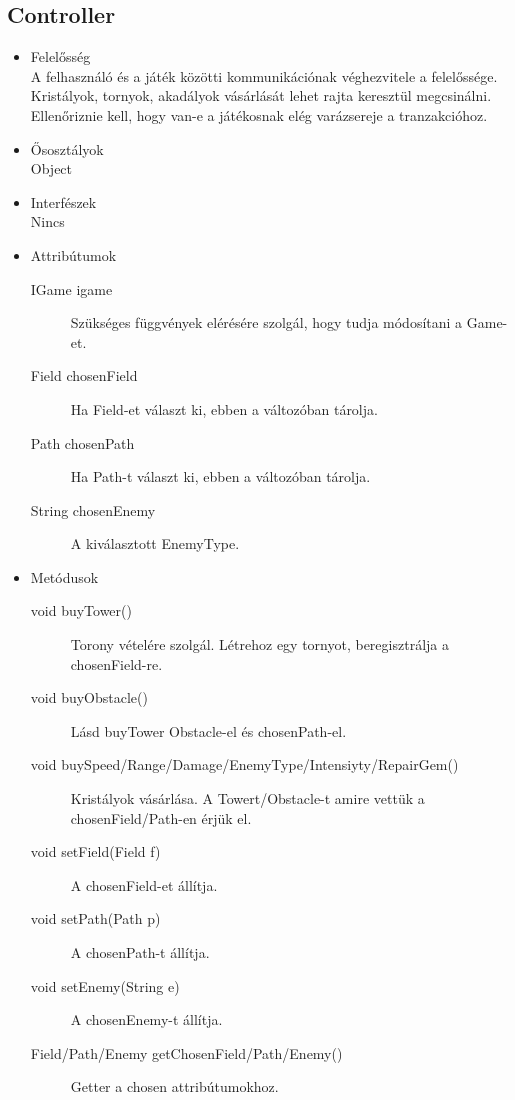 \subsection{Controller}
\begin{itemize}
\item Felelősség\\
A felhasználó és a játék közötti kommunikációnak véghezvitele a felelőssége. Kristályok, tornyok, akadályok vásárlását lehet rajta keresztül megcsinálni. Ellenőriznie kell, hogy van-e a játékosnak elég varázsereje a tranzakcióhoz.
\item Ősosztályok\\
Object
\item Interfészek\\
Nincs
\item Attribútumok\\
	\begin{description}
		\item[IGame igame] Szükséges függvények elérésére szolgál, hogy tudja módosítani a Game-et. 
		\item[Field chosenField] Ha Field-et választ ki, ebben a változóban tárolja. 
		\item[Path chosenPath] Ha Path-t választ ki, ebben a változóban tárolja. 
		\item[String chosenEnemy] A kiválasztott EnemyType. 

		
	\end{description}
\item Metódusok\\
	\begin{description}
		
		\item[void buyTower()] Torony vételére szolgál. Létrehoz egy tornyot, beregisztrálja a chosenField-re. 
		\item[void buyObstacle()] Lásd buyTower Obstacle-el és chosenPath-el. 
		\item[void buySpeed/Range/Damage/EnemyType/Intensiyty/RepairGem()] Kristályok vásárlása. A Towert/Obstacle-t amire vettük a chosenField/Path-en érjük el. 
		\item[void setField(Field f)] A chosenField-et állítja. 
		\item[void setPath(Path p)] A chosenPath-t állítja. 
		\item[void setEnemy(String e)] A chosenEnemy-t állítja. 
		\item[Field/Path/Enemy getChosenField/Path/Enemy()] Getter a chosen attribútumokhoz.
		
		
	\end{description}
\end{itemize}

